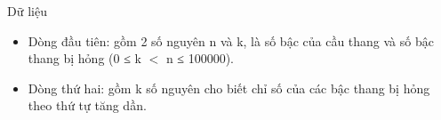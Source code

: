 Dữ liệu
\begin{itemize}
	\item Dòng đầu tiên: gồm 2 số nguyên n và k, là số bậc của cầu thang và số bậc thang bị hỏng (0 ≤ k $<$ n ≤ 100000).
	\item Dòng thứ hai: gồm k số nguyên cho biết chỉ số của các bậc thang bị hỏng theo thứ tự tăng dần.
\end{itemize}